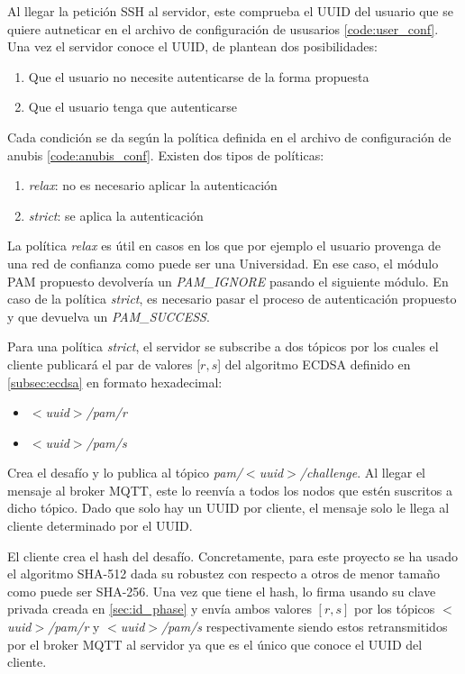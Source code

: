 Al llegar la petición SSH al servidor, este comprueba el UUID del usuario que se quiere autneticar en el 
archivo de configuración de ususarios \ref{code:user_conf}. Una vez el servidor conoce el UUID, de plantean dos posibilidades:

\begin{enumerate}
    \item Que el usuario no necesite autenticarse de la forma propuesta
    \item Que el usuario tenga que autenticarse
\end{enumerate}

Cada condición se da según la política definida en el archivo de configuración de anubis \ref{code:anubis_conf}. Existen dos 
tipos de políticas:

\begin{enumerate}
    \item \textit{relax}: no es necesario aplicar la autenticación
    \item \textit{strict}: se aplica la autenticación
\end{enumerate}

La política \textit{relax} es útil en casos en los que por ejemplo el usuario provenga de una red de confianza como puede ser una
Universidad. En ese caso, el módulo PAM propuesto devolvería un \textit{PAM\_IGNORE} pasando el siguiente módulo. En caso de la 
política \textit{strict}, es necesario pasar el proceso de autenticación propuesto y que devuelva un \textit{PAM\_SUCCESS}.

Para una política \textit{strict}, el servidor se subscribe a dos tópicos por los cuales el cliente publicará el par de valores 
[$r, s$] del algoritmo ECDSA definido en \ref{subsec:ecdsa} en formato hexadecimal:

\begin{itemize}
    \item \textit{$<$uuid$>$/pam/r}
    \item \textit{$<$uuid$>$/pam/s}
\end{itemize}

Crea el desafío y lo publica al tópico \textit{pam/$<$uuid$>$/challenge}. Al llegar el mensaje al broker MQTT, este lo reenvía a todos
los nodos que estén suscritos a dicho tópico. Dado que solo hay un UUID por cliente, el mensaje solo le llega al cliente 
determinado por el UUID. 

El cliente crea el hash del desafío. Concretamente, para este proyecto se ha usado el algoritmo SHA-512 dada su robustez con 
respecto a otros de menor tamaño como puede ser SHA-256. Una vez que tiene el hash, lo firma usando su clave privada creada en
\ref{sec:id_phase} y envía ambos valores $[r,s]$ por los tópicos \textit{$<$uuid$>$/pam/r} y \textit{$<$uuid$>$/pam/s} respectivamente
siendo estos retransmitidos por el broker MQTT al servidor ya que es el único que conoce el UUID del cliente.

